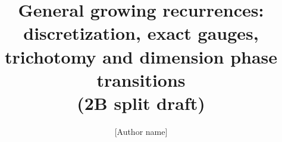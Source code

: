 


\title{General growing recurrences: discretization, exact gauges,\\trichotomy and dimension phase transitions\\(2B split draft)}
\author{[Author name]\\ \relax[Affiliation]}












